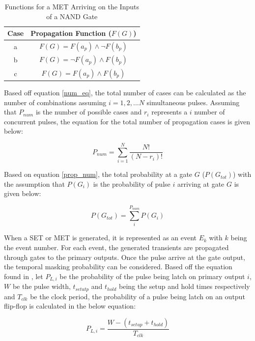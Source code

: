 \begin{table}[ht]
	\begin{center}
		\caption{Functions for a MET Arriving on the Inputs of a NAND Gate}
		\label{table:prop_table}
		\begin{tabular}{|c|c|}
			\hline
			Case & Propagation Function ($F(G)$) \\ 
			\hline
			a & $F(G) = F(a_p) \land \lnot F(b_p)$ \\
			\hline
			b & $F(G) = \lnot F(a_p) \land F(b_p)$ \\
			\hline
			c & $F(G) = F(a_p) \land F(b_p)$ \\
			\hline
		\end{tabular}
	\end{center}
\end{table}

Based off equation \ref{num_eq}, the total number of cases can be calculated as the number of combinations assuming $i = 1,2,...N$ simultaneous pulses. Assuming that $P_{num}$ is the number of possible cases and $r_i$ represents a $i$ number of concurrent pulses, the equation for the total number of propagation cases is given below:

\begin{equation} \label{prop_num}
P_{num} = \sum_{i=1}^{N} \frac{N!}{(N-r_i)!}
\end{equation} 

Based on equation \ref{prop_num}, the total probability at a gate $G$ ($P(G_{tot})$) with the assumption that $P(G_i)$ is the probability of pulse $i$ arriving at gate $G$ is given below:

\begin{equation} \label{tot_gate}
P(G_{tot}) = \sum_{i}^{P_{num}} P(G_i)
\end{equation}

When a SET or MET is generated, it is represented as an event $E_k$ with $k$ being the event number. For each event, the generated transients are propagated through gates to the primary outputs. Once the pulse arrive at the gate output, the temporal masking probability can be considered. Based off the equation found in \cite{Omana_Trap}, let  $P_{L,i}$ be the probability of the pulse being latch on primary output $i$, $W$ be the pulse width, $t_{setutp}$ and $t_{hold}$ being the setup and hold times respectively and $T_{clk}$ be the clock period, the probability of a pulse being latch on an output flip-flop is calculated in the below equation:

\begin{equation} \label{temp_eq}
P_{L,i} = \frac{W - (t_{setup} + t_{hold})}{T_{clk}}
\end{equation}

